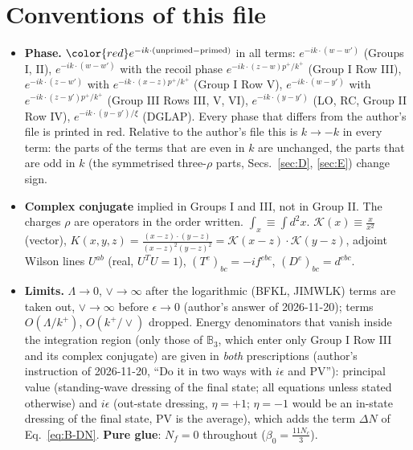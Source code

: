 \section{Conventions of this file}\label{sec:conv}
\begin{itemize}
\item \textbf{Phase.} ${\color{red}e^{-ik\cdot(\text{unprimed}-\text{primed})}}$ in all terms: $e^{-ik\cdot(w-w')}$ (Groups I, II), $e^{-ik\cdot(w-w')}$ with the recoil phase $e^{-ik\cdot(z-w)p^{+}/k^{+}}$ (Group I Row III), $e^{-ik\cdot(z-w')}$ with $e^{-ik\cdot(x-z)p^{+}/k^{+}}$ (Group I Row V), $e^{-ik\cdot(w-y')}$ with $e^{-ik\cdot(z-y')p^{+}/k^{+}}$ (Group III Rows III, V, VI), $e^{-ik\cdot(y-y')}$ (LO, RC, Group II Row IV), $e^{-ik\cdot(y-y')/\xi}$ (DGLAP). Every phase that differs from the author's file is printed in red. Relative to the author's file this is $k\to-k$ in every term: the parts of the terms that are even in $k$ are unchanged, the parts that are odd in $k$ (the symmetrised three-$\rho$ parts, Secs.~\ref{sec:D}, \ref{sec:E}) change sign.
\item \textbf{Complex conjugate} implied in Groups I and III, not in Group II. The charges $\rho$ are operators in the order written. $\int_{x}\equiv\int d^{2}x$. $\mathcal{K}(x)\equiv\frac{x}{x^{2}}$ (vector), $K(x,y,z)=\frac{(x-z)\cdot(y-z)}{(x-z)^{2}(y-z)^{2}}=\mathcal{K}(x-z)\cdot\mathcal{K}(y-z)$, adjoint Wilson lines $U^{ab}$ (real, $U^{T}U=1$), $(T^{e})_{bc}=-if^{ebc}$, $(D^{e})_{bc}=d^{ebc}$.
\item \textbf{Limits.} $\Lambda\to0$, $\vee\to\infty$ after the logarithmic (BFKL, JIMWLK) terms are taken out, $\vee\to\infty$ before $\epsilon\to0$ (author's answer of 2026-11-20); terms $O(\Lambda/k^{+})$, $O(k^{+}/\vee)$ dropped. Energy denominators that vanish inside the integration region (only those of $\mathbb{B}_{3}$, which enter only Group I Row III and its complex conjugate) are given in \emph{both} prescriptions (author's instruction of 2026-11-20, ``Do it in two ways with $i\epsilon$ and PV''): principal value (standing-wave dressing of the final state; all equations unless stated otherwise) and $i\epsilon$ (out-state dressing, $\eta=+1$; $\eta=-1$ would be an in-state dressing of the final state, PV is the average), which adds the term $\Delta N$ of Eq.~\eqref{eq:B-DN}. \textbf{Pure glue}: $N_{f}=0$ throughout ($\beta_{0}=\frac{11N_{c}}{3}$).

\end{itemize}

